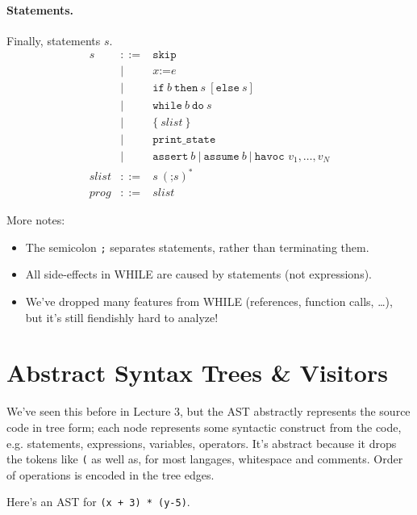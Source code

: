 \documentclass[11pt]{article}
\begin{document}
\paragraph{Statements.} Finally, statements $s$.
\begin{eqnarray*}
s & ::= & \texttt{skip} \\
  & | & x \texttt{:=} e \\
  & | & \texttt{if} ~b~ \texttt{then} ~s~ [\texttt{else}~s] \\
  & | & \texttt{while} ~b~ \texttt{do} ~s \\
  & | & \texttt{\{}\mathit{~slist~}\texttt{\}}\\
  & | & \texttt{print\_state} \\
  & | & \texttt{assert}~b \ | \ \texttt{assume}~b \ | \ \texttt{havoc~} v_1, \ldots, v_N \\
\mathit{slist} &::=& s~ ( \texttt{;} s )^*\\
\mathit{prog} &::=& \mathit{slist}  
\end{eqnarray*}

More notes:
\begin{itemize}[noitemsep]
\item The semicolon \texttt{;} separates statements, rather than terminating them.
\item All side-effects in WHILE are caused by statements (not expressions).
\item We've dropped many features from WHILE (references, function calls, \ldots), but it's still fiendishly hard to analyze!
\end{itemize}

\section*{Abstract Syntax Trees \& Visitors}

We've seen this before in Lecture 3, but the AST abstractly represents the source code in tree form; each node represents some syntactic construct from the code, e.g. statements, expressions, variables, operators. It's abstract because it drops the tokens like \texttt{(} as well as, for most langages, whitespace and comments. Order of operations is encoded in the tree edges.

Here's an AST for \texttt{(x + 3) * (y-5)}.
\begin{center}
\end{center}
\end{document}
